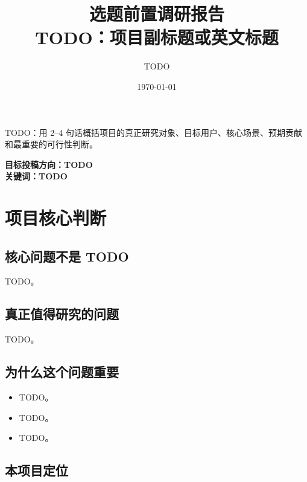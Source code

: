 \documentclass[UTF8,a4paper,11pt]{ctexart}
\title{
  \vspace{-1.5cm}
  \textbf{选题前置调研报告}\\[0.5em]
  \large TODO：项目副标题或英文标题
}
\author{TODO}
\date{\today}
\begin{document}
\maketitle

\begin{tcolorbox}[mybox,title=一句话概括]
TODO：用 2--4 句话概括项目的真正研究对象、目标用户、核心场景、预期贡献和最重要的可行性判断。
\end{tcolorbox}

\vspace{0.5em}

\begin{center}
\textbf{目标投稿方向：TODO}\\
\textbf{关键词：TODO}
\end{center}

\newpage
\tableofcontents
\newpage

\section{项目核心判断}

\subsection{核心问题不是 TODO}

TODO。

\subsection{真正值得研究的问题}

\begin{tcolorbox}[keybox,title=本项目的核心研究问题]
TODO。
\end{tcolorbox}

\subsection{为什么这个问题重要}

\begin{itemize}[leftmargin=2em]
  \item TODO。
  \item TODO。
  \item TODO。
\end{itemize}

\subsection{本项目定位}
\end{document}

